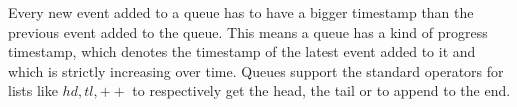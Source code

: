 Every new event added to a queue has to have a bigger timestamp than the previous event added to the queue.
This means a queue has a kind of progress timestamp, which denotes the timestamp of the latest event added to it and which is strictly increasing over time.
Queues support the standard operators for lists like \(\mathit{hd}, \mathit{tl}, ++\) to respectively get the head, the tail or to append to the end.






